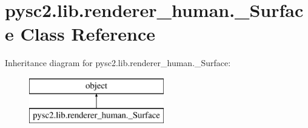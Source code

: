 \hypertarget{classpysc2_1_1lib_1_1renderer__human_1_1___surface}{}\section{pysc2.\+lib.\+renderer\+\_\+human.\+\_\+\+Surface Class Reference}
\label{classpysc2_1_1lib_1_1renderer__human_1_1___surface}
Inheritance diagram for pysc2.\+lib.\+renderer\+\_\+human.\+\_\+\+Surface\+:\begin{figure}[H]
\begin{center}
\leavevmode
\includegraphics[height=2.000000cm]{classpysc2_1_1lib_1_1renderer__human_1_1___surface}
\end{center}
\end{figure}
